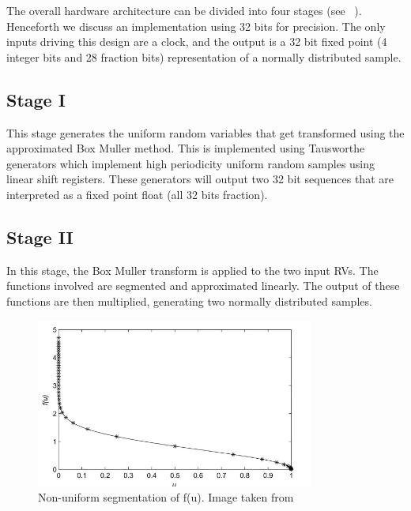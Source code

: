 The overall hardware architecture can be divided into four stages (see \Figure~). Henceforth we discuss an implementation using 32 bits for precision. The only inputs driving this design are a clock, and the output is a 32 bit fixed point (4 integer bits and 28 fraction bits) representation of a normally distributed sample. 

\subsection{Stage I}

This stage generates the uniform random variables that get transformed using the approximated Box Muller method. This is implemented using Tausworthe generators \cite{noise_gen} which implement high periodicity uniform random samples using linear shift registers. These generators will output two 32 bit sequences that are interpreted as a fixed point float (all 32 bits fraction).

\subsection{Stage II}
In this stage, the Box Muller transform is applied to the two input RVs. The functions involved are segmented and approximated linearly. The output of these functions are then multiplied, generating two normally distributed samples.

\begin{figure}
\centering\CaptionFontSize
\includegraphics[height=15em]
{Figures/f_segmentation.png}
\caption[Non-uniform segmentation of f(u)]
{Non-uniform segmentation of f(u). Image taken from \cite{noise_gen}}
\label{Figure:NoiseGeneration:FSegmentation}
\end{figure}

